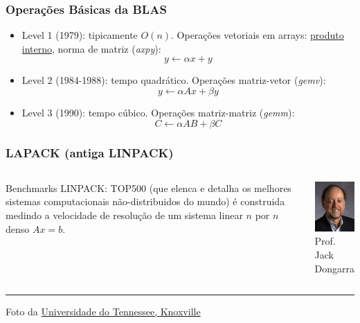 \documentclass{beamer}
\begin{document}
\begin{darkframes}
  \begin{frame}[label=blas]
    \frametitle{Operações Básicas da BLAS}
    \begin{itemize}
    \item Level 1 (1979): tipicamente $O(n)$. Operações vetoriais em arrays: \hyperlink{pi}{produto interno}, norma de matriz (\emph{axpy}):
      \begin{equation*}
        y \leftarrow \alpha x + y
      \end{equation*}
    \item Level 2 (1984-1988): tempo quadrático. Operações matriz-vetor (\emph{gemv}):
      \begin{equation*}
        y \leftarrow \alpha A x + \beta y
      \end{equation*}
    \item Level 3 (1990): tempo cúbico. Operações matriz-matriz (\emph{gemm}):
      \begin{equation*}
        C \leftarrow \alpha A B + \beta C
      \end{equation*}
    \end{itemize}
  \end{frame}

  \begin{frame}
    \frametitle{LAPACK (antiga LINPACK)}
    \begin{columns}
      \column{5cm}
      Benchmarks LINPACK: TOP500 (que elenca e detalha os melhores sistemas computacionais não-distribuidos do mundo) é construida medindo a velocidade de resolução de um sistema linear $n$ por $n$ denso $Ax = b$.
      \column{4cm}
      \begin{center}
        \includegraphics[width=3.8cm]{figures/JackDongarra.jpg}\\
        Prof. Jack Dongarra
      \end{center}
    \end{columns}
    \vfill
    \hrule
    \vskip0.2cm
    \footnotesize{Foto da \hyperlink{https://commons.wikimedia.org/w/index.php?curid=5234147}{Universidade do Tennessee, Knoxville}}
  \end{frame}
  

\end{darkframes}
\end{document}
